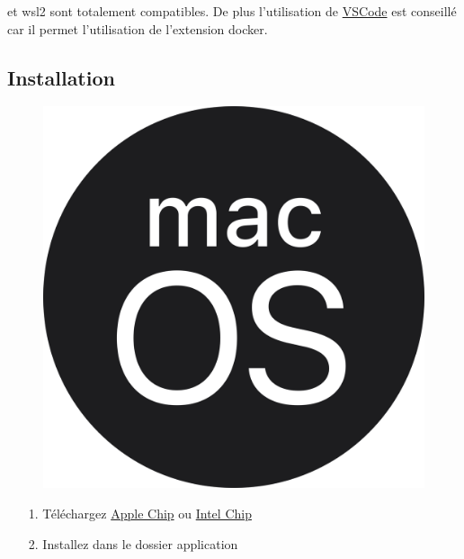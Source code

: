 \documentclass[internal]{nhitec_design}
\begin{document}
        \docker{} et wsl2 sont totalement compatibles. De plus l'utilisation de \href{https://code.visualstudio.com/docs/remote/wsl}{VSCode} est conseillé car il permet l'utilisation de l'extension docker.



    \subsection[Installation MacOS]{Installation \macos{}}

        \begin{figure}[h]
            \centering
            \includegraphics[scale=0.025]{Images_formation/MacosLogo.png}
        \end{figure}

        \begin{itemize}
            \item[1.] Téléchargez \dockerdesktop{} \href{https://desktop.docker.com/mac/main/arm64/Docker.dmg?utm_source=docker&utm_medium=webreferral&utm_campaign=dd-smartbutton&utm_location=module}{Apple Chip} ou \href{https://desktop.docker.com/mac/main/amd64/Docker.dmg?utm_source=docker&utm_medium=webreferral&utm_campaign=dd-smartbutton&utm_location=module}{Intel Chip}
            \item[2.] Installez \dockerdesktop{} dans le dossier application
        \end{itemize}
\end{document}
